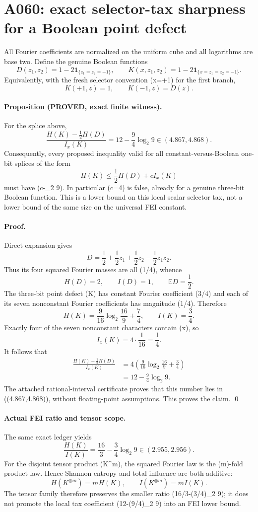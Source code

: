 \section*{A060: exact selector-tax sharpness for a Boolean point defect}

All Fourier coefficients are normalized on the uniform cube and all
logarithms are base two.  Define the genuine Boolean functions
\[
 D(z_1,z_2)=1-2\mathbf 1_{\{z_1=z_2=-1\}},\qquad
 K(x,z_1,z_2)=1-2\mathbf 1_{\{x=z_1=z_2=-1\}}.
\]
Equivalently, with the fresh selector convention (x=+1) for the first
branch,
\[
 K(+1,z)=1,\qquad K(-1,z)=D(z).
\]

\paragraph{Proposition (PROVED, exact finite witness).}
For the splice above,
\[
 \frac{H(K)-\tfrac12 H(D)}{I_x(K)}
 =12-\frac94\log_2 9
 \in(4.867,4.868).
\]
Consequently, every proposed inequality valid for all constant-versus-Boolean
one-bit splices of the form
\[
 H(K)\leq \frac12 H(D)+c I_x(K)
\]
must have (c-\log_2 9).  In particular (c=4) is false,
already for a genuine three-bit Boolean function.  This is a lower bound on
this local scalar selector tax, not a lower bound of the same size on the
universal FEI constant.

\paragraph{Proof.}
Direct expansion gives
\[
 D=\frac12+\frac12z_1+\frac12z_2-\frac12z_1z_2.
\]
Thus its four squared Fourier masses are all (1/4), whence
\[
 H(D)=2,\qquad I(D)=1,\qquad \mathbb E D=\frac12.
\]
The three-bit point defect (K) has constant Fourier coefficient (3/4)
and each of its seven nonconstant Fourier coefficients has magnitude (1/4).
Therefore
\[
 H(K)=\frac9{16}\log_2\frac{16}{9}+\frac74,
 \qquad I(K)=\frac34.
\]
Exactly four of the seven nonconstant characters contain (x), so
\[
 I_x(K)=4\cdot\frac1{16}=\frac14.
\]
It follows that
\begin{align*}
 \frac{H(K)-\tfrac12H(D)}{I_x(K)}
 &=4\left(\frac9{16}\log_2\frac{16}{9}+\frac34\right)\\
 &=12-\frac94\log_2 9.
\end{align*}
The attached rational-interval certificate proves that this number lies in
((4.867,4.868)), without floating-point assumptions.  This proves the
claim. \qed

\paragraph{Actual FEI ratio and tensor scope.}
The same exact ledger yields
\[
 \frac{H(K)}{I(K)}
 =\frac{16}{3}-\frac34\log_2 9
 \in(2.955,2.956).
\]
For the disjoint tensor product (K^{\otimes m}), the squared Fourier law is
the (m)-fold product law.  Hence Shannon entropy and total influence are
both additive:
\[
 H(K^{\otimes m})=mH(K),\qquad
 I(K^{\otimes m})=mI(K).
\]
The tensor family therefore preserves the smaller ratio
(16/3-(3/4)\log_2 9); it does not promote the local tax coefficient
(12-(9/4)\log_2 9) into an FEI lower bound.

